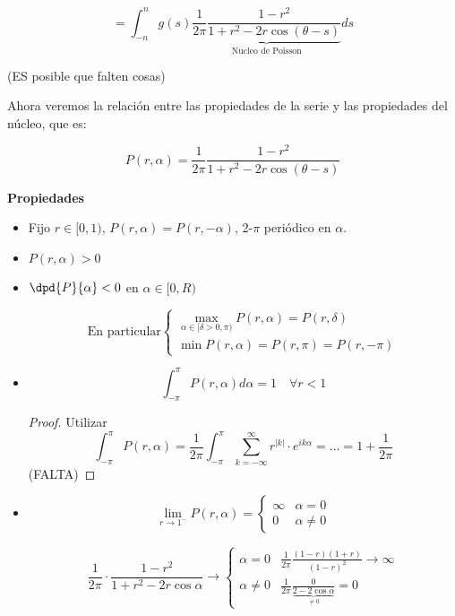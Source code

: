 		\[ = \int^{n}_{-n} g(s) \underbrace{\frac{1}{2\pi} \frac{1-r^2}{1+r^2-2r\cos (\theta - s)}}_{\text{Nucleo de Poisson}} ds \]

		(ES posible que falten cosas)

		Ahora veremos la relación entre las propiedades de la serie y las propiedades del núcleo, que es:

		\[P(r,\alpha) = \frac{1}{2\pi} \frac{1-r^2}{1+r^2-2r\cos (\theta - s)} \]


		\textbf{Propiedades}

		\begin{itemize}

			\item Fijo $r \in [0,1)$, $P(r,\alpha) = P(r,-\alpha)$, 2-$\pi$ periódico en $\alpha$.

			\item $P(r,\alpha) > 0$

			\item $\dpd{P}{\alpha} < 0$ en $\alpha \in [0,R)$

			\[ \text{En particular} \begin{cases}
				\max_{\alpha \in [\delta > 0, \pi)} P(r,\alpha) = P(r,\delta) \\
				\min P(r,\alpha) = P(r,\pi) = P(r,-\pi)
			\end{cases} \]

			\item \[
				\int_{-\pi}^\pi P(r, \alpha) d\alpha = 1 \quad \forall r < 1
			\]

			\begin{proof}
				Utilizar \[ \int_{-\pi}^\pi P(r, \alpha) = \frac{1}{2\pi} \int_{-\pi}^\pi \sum_{k=-\infty}^{\infty} r^{|k|} \cdot e^{ik\alpha}  = … = 1 + \frac{1}{2\pi}  \]
				(FALTA)
			\end{proof}


			\item \[
			\lim_{r \to 1^-} P(r, \alpha) = \begin{cases}
				\infty & \alpha = 0 \\
				0 & \alpha \neq 0
			\end{cases}
			\]

			\[
				\frac{1}{2\pi} \cdot \frac{1-r^2}{1+r^2-2r\cos \alpha} \rightarrow \begin{cases}
				\alpha = 0 & \frac{1}{2\pi} \frac{(1-r)(1+r)}{(1-r)^2} \rightarrow \infty \\
				\alpha \neq 0  & \frac{1}{2\pi} \frac{0}{\underbrace{2-2\cos \alpha}_{\neq 0}} = 0
				\end{cases}
			\]


\end{itemize}
